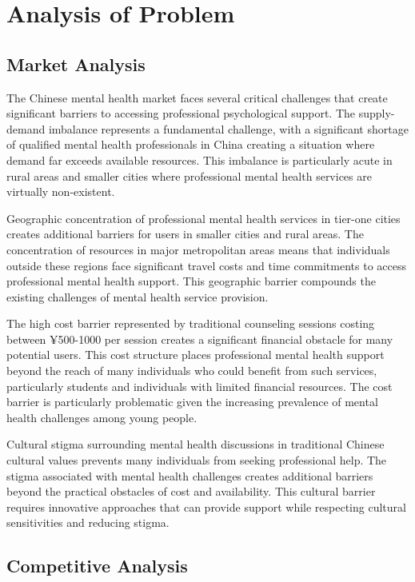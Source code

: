 \section{Analysis of Problem}
\label{sec:problem_analysis}

\subsection{Market Analysis}

The Chinese mental health market faces several critical challenges that create significant barriers to accessing professional psychological support. The supply-demand imbalance represents a fundamental challenge, with a significant shortage of qualified mental health professionals in China creating a situation where demand far exceeds available resources. This imbalance is particularly acute in rural areas and smaller cities where professional mental health services are virtually non-existent.

Geographic concentration of professional mental health services in tier-one cities creates additional barriers for users in smaller cities and rural areas. The concentration of resources in major metropolitan areas means that individuals outside these regions face significant travel costs and time commitments to access professional mental health support. This geographic barrier compounds the existing challenges of mental health service provision.

The high cost barrier represented by traditional counseling sessions costing between ¥500-1000 per session creates a significant financial obstacle for many potential users. This cost structure places professional mental health support beyond the reach of many individuals who could benefit from such services, particularly students and individuals with limited financial resources. The cost barrier is particularly problematic given the increasing prevalence of mental health challenges among young people.

Cultural stigma surrounding mental health discussions in traditional Chinese cultural values prevents many individuals from seeking professional help. The stigma associated with mental health challenges creates additional barriers beyond the practical obstacles of cost and availability. This cultural barrier requires innovative approaches that can provide support while respecting cultural sensitivities and reducing stigma.

\subsection{Competitive Analysis}

